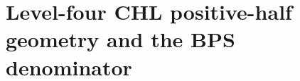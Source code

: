 %

\providecommand{\bC}{\mathbb{C}}
\providecommand{\bZ}{\mathbb{Z}}
\providecommand{\bQ}{\mathbb{Q}}
\providecommand{\Aut}{\mathrm{Aut}}
\providecommand{\Auts}{\mathrm{Aut}_s}
\providecommand{\Coh}{\mathrm{Coh}}
\providecommand{\CoHA}{\mathrm{CoHA}}
\providecommand{\DT}{\mathrm{DT}}
\providecommand{\red}{\mathrm{red}}
\providecommand{\BKM}{\mathrm{BKM}}
\providecommand{\cat}{\mathrm{cat}}
\providecommand{\fib}{\mathrm{fiber}}
\providecommand{\eff}{\mathrm{eff}}
\providecommand{\BPS}{\mathrm{BPS}}
\providecommand{\mult}{\mathrm{mult}}
\providecommand{\sdim}{\mathrm{sdim}}
\providecommand{\Hilb}{\mathrm{Hilb}}
\providecommand{\Rep}{\mathrm{Rep}}
\providecommand{\cO}{\mathcal{O}}
\providecommand{\cA}{\mathcal{A}}
\providecommand{\cM}{\mathcal{M}}
\providecommand{\cW}{\mathcal{W}}
\providecommand{\fg}{\mathfrak{g}}
\providecommand{\Teq}{T_{\mathrm{eq}}}
\providecommand{\Eone}{E_1}
\providecommand{\Etwo}{E_2}
\providecommand{\DTred}{Z^{\mathrm{red}}_{\mathrm{DT}}}
\providecommand{\kch}{\kappa_{\mathrm{ch}}}
\providecommand{\kchHeis}{\kappa_{\mathrm{ch}}^{\mathrm{Heis}}}
\providecommand{\kBKM}{\kappa_{\mathrm{BKM}}}
\providecommand{\kcat}{\kappa_{\mathrm{cat}}}
\providecommand{\kfib}{\kappa_{\mathrm{fiber}}}
\providecommand{\PhiFour}{\Phi_4}

\section*{Level-four CHL positive-half geometry and the BPS denominator}
\label{wn:sec:N4-positive-half-BPS}

